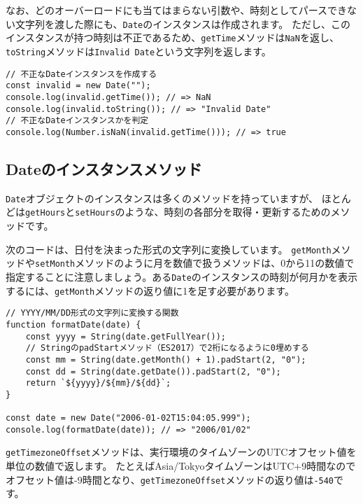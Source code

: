 なお、どのオーバーロードにも当てはまらない引数や、時刻としてパースできない文字列を渡した際にも、\texttt{Date}のインスタンスは作成されます。
ただし、このインスタンスが持つ時刻は不正であるため、\texttt{getTime}メソッドは\texttt{NaN}を返し、\texttt{toString}メソッドは\texttt{Invalid Date}という文字列を返します。

\begin{lstlisting}
// 不正なDateインスタンスを作成する
const invalid = new Date("");
console.log(invalid.getTime()); // => NaN
console.log(invalid.toString()); // => "Invalid Date"
// 不正なDateインスタンスかを判定
console.log(Number.isNaN(invalid.getTime())); // => true
\end{lstlisting}

\hypertarget{instance-method}{%
\subsection{Dateのインスタンスメソッド}\label{instance-method}}

\texttt{Date}オブジェクトのインスタンスは多くのメソッドを持っていますが、
ほとんどは\texttt{getHours}と\texttt{setHours}のような、時刻の各部分を取得・更新するためのメソッドです。

次のコードは、日付を決まった形式の文字列に変換しています。
\texttt{getMonth}メソッドや\texttt{setMonth}メソッドのように月を数値で扱うメソッドは、0から11の数値で指定することに注意しましょう。ある\texttt{Date}のインスタンスの時刻が何月かを表示するには、\texttt{getMonth}メソッドの返り値に1を足す必要があります。

\begin{lstlisting}
// YYYY/MM/DD形式の文字列に変換する関数
function formatDate(date) {
    const yyyy = String(date.getFullYear());
    // StringのpadStartメソッド（ES2017）で2桁になるように0埋めする
    const mm = String(date.getMonth() + 1).padStart(2, "0");
    const dd = String(date.getDate()).padStart(2, "0");
    return `${yyyy}/${mm}/${dd}`;
}

const date = new Date("2006-01-02T15:04:05.999");
console.log(formatDate(date)); // => "2006/01/02"
\end{lstlisting}

\texttt{getTimezoneOffset}メソッドは、実行環境のタイムゾーンのUTC\textbf{}オフセット値を\textbf{}単位の数値で返します。
たとえばAsia/TokyoタイムゾーンはUTC+9時間なのでオフセット値は-9時間となり、\texttt{getTimezoneOffset}メソッドの返り値は\texttt{-540}です。

